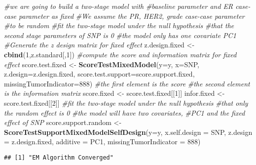\documentclass[11pt,]{article}
\newenvironment{Shaded}{\begin{snugshade}}{\end{snugshade}}
\newcommand{\KeywordTok}[1]{\textcolor[rgb]{0.13,0.29,0.53}{\textbf{#1}}}
\newcommand{\DataTypeTok}[1]{\textcolor[rgb]{0.13,0.29,0.53}{#1}}
\newcommand{\DecValTok}[1]{\textcolor[rgb]{0.00,0.00,0.81}{#1}}
\newcommand{\StringTok}[1]{\textcolor[rgb]{0.31,0.60,0.02}{#1}}
\newcommand{\CommentTok}[1]{\textcolor[rgb]{0.56,0.35,0.01}{\textit{#1}}}
\newcommand{\NormalTok}[1]{#1}
\begin{document}
\begin{Shaded}
\begin{Highlighting}[]
\CommentTok{#we are going to build a two-stage model with }
\CommentTok{#baseline parameter and ER case-case parameter as fixed}
\CommentTok{#We assume the PR, HER2, grade case-case parameter }
\CommentTok{#to be random}
\CommentTok{#fit the two-stage model under the null hypothesis}
\CommentTok{#that the second stage parameters of SNP is 0}
\CommentTok{#the model only has one covariate PC1}
\CommentTok{#Generate the z design matrix for fixed effect}
\NormalTok{z.design.fixed <-}\StringTok{ }\KeywordTok{cbind}\NormalTok{(}\DecValTok{1}\NormalTok{,z.standard[,}\DecValTok{1}\NormalTok{])}
\CommentTok{#compute the score and information matrix for fixed effect}
\NormalTok{score.test.fixed <-}\StringTok{ }\KeywordTok{ScoreTestMixedModel}\NormalTok{(}\DataTypeTok{y=}\NormalTok{y,}
                    \DataTypeTok{x=}\NormalTok{SNP,}
                    \DataTypeTok{z.design=}\NormalTok{z.design.fixed,}
                    \DataTypeTok{score.test.support=}\NormalTok{score.support.fixed,}
                    \DataTypeTok{missingTumorIndicator=}\DecValTok{888}\NormalTok{)}
\CommentTok{#the first element is the score}
\CommentTok{#the second element is the information matrix}
\NormalTok{score.fixed <-}\StringTok{ }\NormalTok{score.test.fixed[[}\DecValTok{1}\NormalTok{]]}
\NormalTok{infor.fixed <-}\StringTok{ }\NormalTok{score.test.fixed[[}\DecValTok{2}\NormalTok{]]}
\CommentTok{#fit the two-stage model under the null hypothesis}
\CommentTok{#that only the random effect is 0}
\CommentTok{#the model will have two covariates, }
\CommentTok{#PC1 and the fixed effect of SNP}
\NormalTok{score.support.random <-}\StringTok{ }\KeywordTok{ScoreTestSupportMixedModelSelfDesign}\NormalTok{(}\DataTypeTok{y=}\NormalTok{y,}
                        \DataTypeTok{x.self.design  =}\NormalTok{ SNP,}
                        \DataTypeTok{z.design =}\NormalTok{ z.design.fixed,}
                        \DataTypeTok{additive =}\NormalTok{ PC1,}
                        \DataTypeTok{missingTumorIndicator =} \DecValTok{888}\NormalTok{)}
\end{Highlighting}
\end{Shaded}

\begin{verbatim}
## [1] "EM Algorithm Converged"
\end{verbatim}
\end{document}
